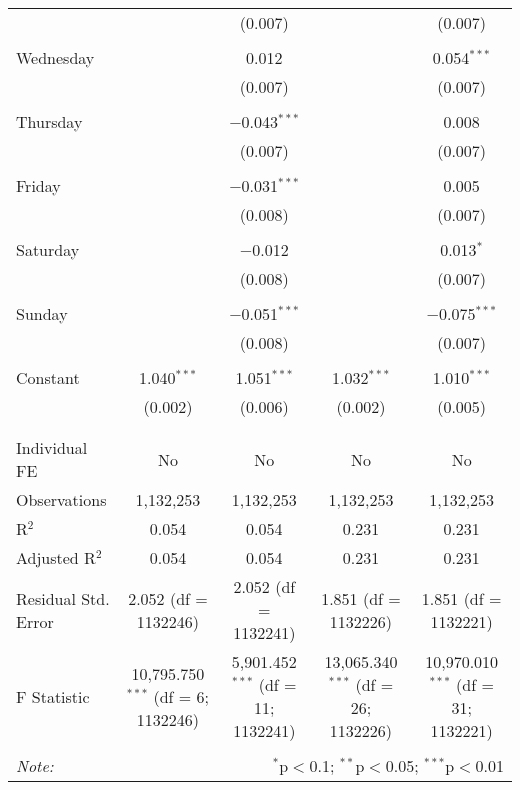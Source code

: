 \documentclass[
]{article}
\begin{document}
\begin{table}[!htbp]
{\begin{tabular}{@{\extracolsep{5pt}}lcccc}
  &  & (0.007) &  & (0.007) \\ 
  & & & & \\ 
 Wednesday &  & 0.012 &  & 0.054$^{***}$ \\ 
  &  & (0.007) &  & (0.007) \\ 
  & & & & \\ 
 Thursday &  & $-$0.043$^{***}$ &  & 0.008 \\ 
  &  & (0.007) &  & (0.007) \\ 
  & & & & \\ 
 Friday &  & $-$0.031$^{***}$ &  & 0.005 \\ 
  &  & (0.008) &  & (0.007) \\ 
  & & & & \\ 
 Saturday &  & $-$0.012 &  & 0.013$^{*}$ \\ 
  &  & (0.008) &  & (0.007) \\ 
  & & & & \\ 
 Sunday &  & $-$0.051$^{***}$ &  & $-$0.075$^{***}$ \\ 
  &  & (0.008) &  & (0.007) \\ 
  & & & & \\ 
 Constant & 1.040$^{***}$ & 1.051$^{***}$ & 1.032$^{***}$ & 1.010$^{***}$ \\ 
  & (0.002) & (0.006) & (0.002) & (0.005) \\ 
  & & & & \\ 
\hline \\[-1.8ex] 
Individual FE & No & No & No & No \\ 
Observations & 1,132,253 & 1,132,253 & 1,132,253 & 1,132,253 \\ 
R$^{2}$ & 0.054 & 0.054 & 0.231 & 0.231 \\ 
Adjusted R$^{2}$ & 0.054 & 0.054 & 0.231 & 0.231 \\ 
Residual Std. Error & 2.052 (df = 1132246) & 2.052 (df = 1132241) & 1.851 (df = 1132226) & 1.851 (df = 1132221) \\ 
F Statistic & 10,795.750$^{***}$ (df = 6; 1132246) & 5,901.452$^{***}$ (df = 11; 1132241) & 13,065.340$^{***}$ (df = 26; 1132226) & 10,970.010$^{***}$ (df = 31; 1132221) \\ 
\hline 
\hline \\[-1.8ex] 
\textit{Note:}  & \multicolumn{4}{r}{$^{*}$p$<$0.1; $^{**}$p$<$0.05; $^{***}$p$<$0.01} \\ 
\end{tabular}
} 
\end{table} 
\newpage
\end{document}
